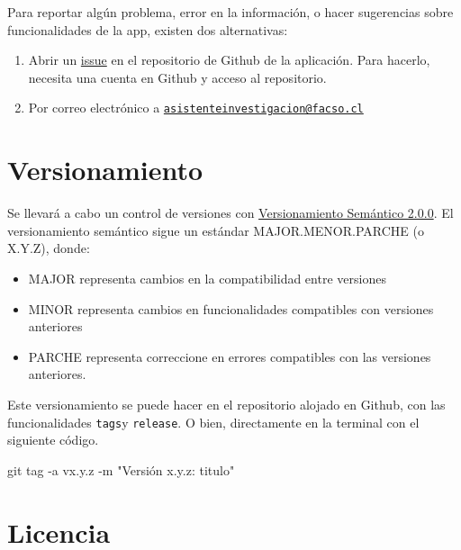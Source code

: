 \documentclass[
  spanish,
  letterpaper,
  DIV=11,
  numbers=noendperiod]{scrreprt}
\newenvironment{Shaded}{\begin{snugshade}}{\end{snugshade}}
\newcommand{\AttributeTok}[1]{\textcolor[rgb]{0.40,0.45,0.13}{#1}}
\newcommand{\FunctionTok}[1]{\textcolor[rgb]{0.28,0.35,0.67}{#1}}
\newcommand{\NormalTok}[1]{\textcolor[rgb]{0.00,0.23,0.31}{#1}}
\newcommand{\StringTok}[1]{\textcolor[rgb]{0.13,0.47,0.30}{#1}}
\providecommand{\tightlist}{%
  \setlength{\itemsep}{0pt}\setlength{\parskip}{0pt}}
\begin{document}
Para reportar algún problema, error en la información, o hacer
sugerencias sobre funcionalidades de la app, existen dos alternativas:

\begin{enumerate}
\def\labelenumi{\arabic{enumi})}
\item
  Abrir un
  \href{https://github.com/facso-investigacion/bases-datos-dip/issues}{issue}
  en el repositorio de Github de la aplicación. Para hacerlo, necesita
  una cuenta en Github y acceso al repositorio.
\item
  Por correo electrónico a
  \href{mailto:asistenteinvestigacion@facso.cl}{\nolinkurl{asistenteinvestigacion@facso.cl}}
\end{enumerate}

\section{Versionamiento}\label{versionamiento}

Se llevará a cabo un control de versiones con
\href{https://semver.org/lang/es/}{Versionamiento Semántico 2.0.0}. El
versionamiento semántico sigue un estándar MAJOR.MENOR.PARCHE (o X.Y.Z),
donde:

\begin{itemize}
\tightlist
\item
  MAJOR representa cambios en la compatibilidad entre versiones
\item
  MINOR representa cambios en funcionalidades compatibles con versiones
  anteriores
\item
  PARCHE representa correccione en errores compatibles con las versiones
  anteriores.
\end{itemize}

Este versionamiento se puede hacer en el repositorio alojado en Github,
con las funcionalidades \texttt{tags}y \texttt{release}. O bien,
directamente en la terminal con el siguiente código.

\begin{Shaded}
\begin{Highlighting}[]
\FunctionTok{git}\NormalTok{ tag }\AttributeTok{{-}a}\NormalTok{ vx.y.z }\AttributeTok{{-}m} \StringTok{"Versión x.y.z: titulo"}
\end{Highlighting}
\end{Shaded}

\section{Licencia}\label{licencia}
\end{document}
